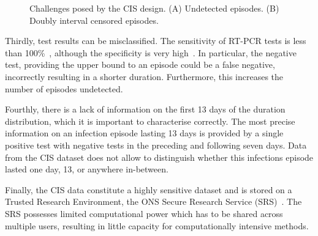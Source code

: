 \documentclass[12pt]{article}
\begin{document}
\begin{figure}
  \caption{%
    Challenges posed by the CIS design.
    (A) Undetected episodes.
    (B) Doubly interval censored episodes.
  }
  \label{fig:challenges}
\end{figure}


Thirdly, test results can be misclassified.
The sensitivity of RT-PCR tests is less than 100\%~\citep{blakeThesis}, although the specificity is very high~\citep{cisMethodsONS}.
In particular, the negative test, providing the upper bound to an episode could be a false negative, incorrectly resulting in a shorter duration.  Furthermore, this increases the number of episodes undetected.

Fourthly, there is a lack of information on the first 13 days of the duration distribution, which it is important to characterise correctly.
The most precise information on an infection episode lasting 13 days is provided by a single positive test with negative tests in the preceding and following seven days.
Data from the CIS dataset does not allow to distinguish whether this infections episode lasted one day, 13, or anywhere in-between.

Finally, the CIS data constitute a highly sensitive dataset and is stored on a Trusted Research Environment, the ONS Secure Research Service (SRS)~\citep{onsSRS}.
The SRS possesses limited computational power which has to be shared across multiple users, resulting in little capacity for computationally intensive methods.


\end{document}
